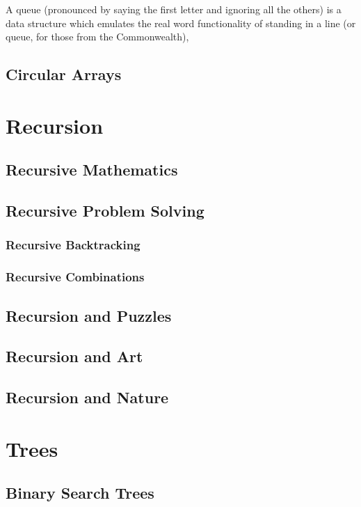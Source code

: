 \documentclass[10pt,a4paper]{book}
\begin{document}
A queue (pronounced by saying the first letter and ignoring all the others) is a data structure which emulates the real word functionality of standing in a line (or queue, for those from the Commonwealth), 
\section{Circular Arrays}


\chapter{Recursion}

\section{Recursive Mathematics}

\section{Recursive Problem Solving}

\subsection{Recursive Backtracking}
\subsection{Recursive Combinations}



\section{Recursion and Puzzles}


\section{Recursion and Art}
\section{Recursion and Nature}


\chapter{Trees}

\section{Binary Search Trees}
\end{document}
